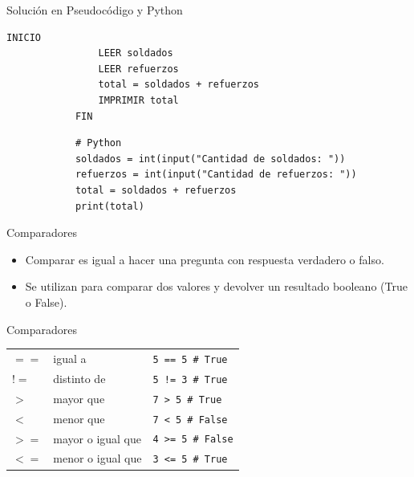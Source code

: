 \documentclass{beamer}
\begin{document}
    \begin{frame}[fragile]{Solución en Pseudocódigo y Python}
        \begin{lstlisting}[language=PseudocodigoES]
            INICIO
                LEER soldados
                LEER refuerzos
                total = soldados + refuerzos
                IMPRIMIR total
            FIN
        \end{lstlisting}
        \begin{verbatim}
            # Python
            soldados = int(input("Cantidad de soldados: "))
            refuerzos = int(input("Cantidad de refuerzos: "))
            total = soldados + refuerzos
            print(total)
        \end{verbatim}
    \end{frame}

    \begin{frame}[fragile,t]{Comparadores}
        \begin{itemize}
            \item Comparar es igual a hacer una pregunta con respuesta verdadero o falso.
            \item Se utilizan para comparar dos valores y devolver un resultado booleano (True o False).
        \end{itemize}
    \end{frame}

    \begin{frame}[fragile,t]{Comparadores}
        \begin{tabular}{m{} m{} m{}}
            $==$ & igual a & \texttt{5 == 5 # True} \\
            $!=$ & distinto de & \texttt{5 != 3 # True} \\
            $>$ & mayor que & \texttt{7 > 5 # True} \\
            $<$ & menor que & \texttt{7 < 5 # False} \\
            $>=$ & mayor o igual que & \texttt{4 >= 5 # False} \\
            $<=$ & menor o igual que & \texttt{3 <= 5 # True} \\
        \end{tabular}
    \end{frame}
\end{document}

